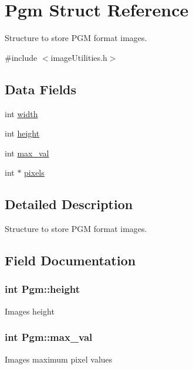 \hypertarget{struct_pgm}{}\section{Pgm Struct Reference}
\label{struct_pgm}


Structure to store P\+G\+M format images.  




{\ttfamily \#include $<$image\+Utilities.\+h$>$}

\subsection*{Data Fields}
\begin{DoxyCompactItemize}
\item 
int \hyperlink{struct_pgm_a093d928bb493b2da54111430b9892431}{width}
\item 
int \hyperlink{struct_pgm_a63916fb4e37e9dacde69a357d1ce1792}{height}
\item 
int \hyperlink{struct_pgm_ae08337a7a42cdc9b14471182c5b273df}{max\+\_\+val}
\item 
int $\ast$ \hyperlink{struct_pgm_ae17366c9c7b4703933dffc77ba68b77c}{pixels}
\end{DoxyCompactItemize}


\subsection{Detailed Description}
Structure to store P\+G\+M format images. 

\subsection{Field Documentation}
\hypertarget{struct_pgm_a63916fb4e37e9dacde69a357d1ce1792}{}
\subsubsection[{height}]{\setlength{\rightskip}{0pt plus 5cm}int Pgm\+::height}\label{struct_pgm_a63916fb4e37e9dacde69a357d1ce1792}
Image\textquotesingle{}s height \hypertarget{struct_pgm_ae08337a7a42cdc9b14471182c5b273df}{}
\subsubsection[{max\+\_\+val}]{\setlength{\rightskip}{0pt plus 5cm}int Pgm\+::max\+\_\+val}\label{struct_pgm_ae08337a7a42cdc9b14471182c5b273df}
Image\textquotesingle{}s maximum pixel values \hypertarget{struct_pgm_ae17366c9c7b4703933dffc77ba68b77c}{}
